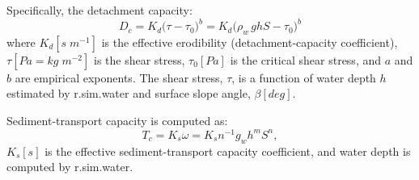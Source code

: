 \documentclass[gmd, manuscript]{copernicus}
\begin{document}
Specifically,  the detachment capacity:
\begin{equation}
\label{eq:detach_cap}
D_c =K_d  \bigl(\tau - \tau_0 \bigr)^b = K_d  \bigl(\rho_w\, g h  S - \tau_0 \bigr)^b 
\end{equation}
\smallskip
\noindent
where
$K_d  [s \; m^{-1}]$ is the effective erodibility (detachment-capacity coefficient),
$\tau [Pa=kg \; m^{-2}]$ is the shear stress,
$\tau_0  [Pa]$ is the critical shear stress,
and $a$ and $b$ are empirical exponents.
The shear stress, $\tau $, is a function of water
depth $h$ estimated by r.sim.water and surface slope angle, $\beta [deg] $.

Sediment-transport capacity is computed as:
\smallskip
\begin{equation}
\label{eq:tc_streampower}
T_c =K_s \omega =
K_s n ^{-1} g_w h^{m}  S^{n}, 
\end{equation}
\smallskip
\noindent
$K_s [s]$ is the effective sediment-transport capacity coefficient, and water depth is computed by r.sim.water.


\end{document}

